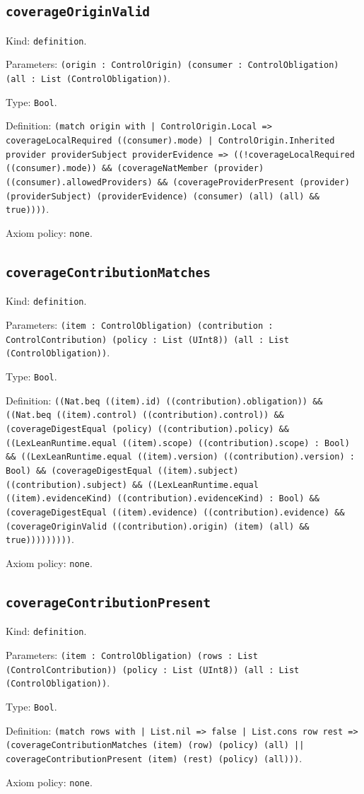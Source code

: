 \documentclass[11pt]{article}
\begin{document}
\subsection*{\texttt{coverageOriginValid}}
\noindent Kind: \texttt{definition}.\par
\noindent Parameters: \texttt{(origin : ControlOrigin) (consumer : ControlObligation) (all : List (ControlObligation))}.\par
\noindent Type: \texttt{Bool}.\par
\noindent Definition: \texttt{(match origin with | ControlOrigin.Local => coverageLocalRequired ((consumer).mode) | ControlOrigin.Inherited provider providerSubject providerEvidence => ((!coverageLocalRequired ((consumer).mode)) \&\& (coverageNatMember (provider) ((consumer).allowedProviders) \&\& (coverageProviderPresent (provider) (providerSubject) (providerEvidence) (consumer) (all) (all) \&\& true))))}.\par
\noindent Axiom policy: \texttt{none}.\par
\subsection*{\texttt{coverageContributionMatches}}
\noindent Kind: \texttt{definition}.\par
\noindent Parameters: \texttt{(item : ControlObligation) (contribution : ControlContribution) (policy : List (UInt8)) (all : List (ControlObligation))}.\par
\noindent Type: \texttt{Bool}.\par
\noindent Definition: \texttt{((Nat.beq ((item).id) ((contribution).obligation)) \&\& ((Nat.beq ((item).control) ((contribution).control)) \&\& (coverageDigestEqual (policy) ((contribution).policy) \&\& ((LexLeanRuntime.equal ((item).scope) ((contribution).scope) : Bool) \&\& ((LexLeanRuntime.equal ((item).version) ((contribution).version) : Bool) \&\& (coverageDigestEqual ((item).subject) ((contribution).subject) \&\& ((LexLeanRuntime.equal ((item).evidenceKind) ((contribution).evidenceKind) : Bool) \&\& (coverageDigestEqual ((item).evidence) ((contribution).evidence) \&\& (coverageOriginValid ((contribution).origin) (item) (all) \&\& true)))))))))}.\par
\noindent Axiom policy: \texttt{none}.\par
\subsection*{\texttt{coverageContributionPresent}}
\noindent Kind: \texttt{definition}.\par
\noindent Parameters: \texttt{(item : ControlObligation) (rows : List (ControlContribution)) (policy : List (UInt8)) (all : List (ControlObligation))}.\par
\noindent Type: \texttt{Bool}.\par
\noindent Definition: \texttt{(match rows with | List.nil => false | List.cons row rest => (coverageContributionMatches (item) (row) (policy) (all) || coverageContributionPresent (item) (rest) (policy) (all)))}.\par
\noindent Axiom policy: \texttt{none}.\par
\end{document}
